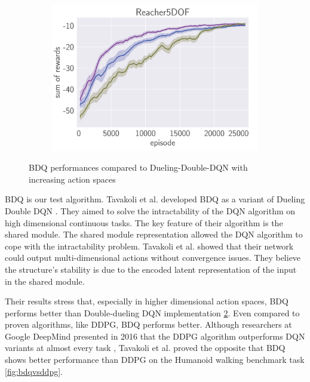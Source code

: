 \begin{figure}[htbp]
    \hspace*{\fill}   %
    \begin{subfigure}{0.31\textwidth}
      \includegraphics[width=\linewidth]{figures/BDQ3.png}
      \caption{} \label{fig:1b}
    \end{subfigure}%

\caption{BDQ performances compared to Dueling-Double-DQN with increasing action spaces \label{fig:BDQvsDDQN}}
\end{figure}

BDQ is our test algorithm. Tavakoli et al. developed BDQ as a variant of Dueling Double DQN \cite{Tavakoli2018}. They aimed to solve the intractability of the DQN algorithm on high dimensional continuous tasks. The key feature of their algorithm is the shared module. The shared module representation allowed the DQN algorithm to cope with the intractability problem. Tavakoli et al. showed that their network could output multi-dimensional actions without convergence issues. They believe the structure's stability is due to the encoded latent representation of the input in the shared module.

Their results stress that, especially in higher dimensional action spaces, BDQ performs better than Double-dueling DQN implementation \ref{fig:BDQvsDDQN}. Even compared to proven algorithms, like DDPG, BDQ performs better. Although researchers at Google DeepMind presented in 2016 that the DDPG algorithm outperforms DQN variants at almost every task \cite{Lillicrap2016}, Tavakoli et al. proved the opposite that BDQ shows better performance than DDPG on the Humanoid walking benchmark task \ref{fig:bdqvsddpg}.

